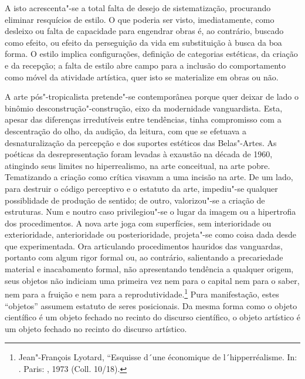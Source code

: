 A isto acrescenta"-se a total falta de desejo de sistematização,
procurando eliminar resquícios de estilo. O que poderia ser visto,
imediatamente, como desleixo ou falta de capacidade para engendrar obras
é, ao contrário, buscado como efeito, ou efeito da perseguição da vida
em substituição à busca da boa forma. O estilo implica configurações,
definição de categorias estéticas, da criação e da recepção; a falta de
estilo abre campo para a inclusão do comportamento como móvel da
atividade artística, quer isto se materialize em obras ou não.

\asterisc

A arte pós"-tropicalista pretende"-se contemporânea porque quer deixar de
lado o binômio desconstrução"-construção, eixo da modernidade
vanguardista. Esta, apesar das diferenças irredutíveis entre tendências,
tinha compromisso com a descentração do olho, da audição, da leitura,
com que se efetuava a desnaturalização da percepção e dos suportes
estéticos das Belas"-Artes. As poéticas da desrepresentação foram levadas
à exaustão na década de 1960, atingindo seus limites no hiperrealismo,
na arte conceitual, na arte pobre. Tematizando a criação como crítica
visavam a uma incisão na arte. De um lado, para destruir o código
perceptivo e o estatuto da arte, impediu"-se qualquer possiblidade de
produção de sentido; de outro, valorizou"-se a criação de estruturas. Num
e noutro caso privilegiou"-se o lugar da imagem ou a hipertrofia dos
procedimentos. A nova arte joga com superfícies, sem interioridade ou
exterioridade, anterioridade ou posterioridade, projeta"-se como coisa
dada desde que experimentada. Ora articulando procedimentos hauridos das
vanguardas, portanto com algum rigor formal ou, ao contrário,
salientando a precariedade material e inacabamento formal, não
apresentando tendência a qualquer origem, seus objetos não indiciam uma
primeira vez nem para o capital nem para o saber, nem para a fruição e
nem para a reprodutividade.\footnote{Jean"-François Lyotard, ``Esquisse
  d´une économique de l´hipperréalisme. In: {}. Paris: , 1973 (Coll. 10/18).} Pura manifestação,
estes ``objetos'' assumem estatuto de seres posicionais. Da mesma forma
como o objeto científico é um objeto fechado no recinto do discurso
científico, o objeto artístico é um objeto fechado no recinto do
discurso artístico.

